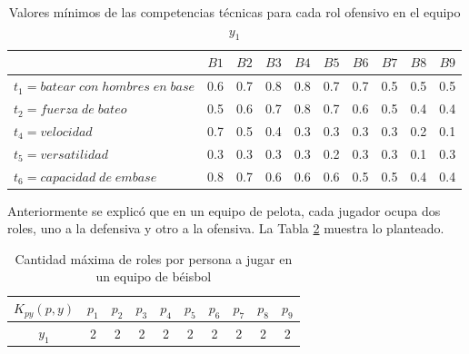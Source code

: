 \begin{table}[H]
	\centering
	\caption{Valores mínimos de las competencias técnicas para cada rol ofensivo en el equipo $y_1$}\label{mcto1-pel}
	\begin{tabular}{|l|c|c|c|c|c|c|c|c|c|}
		\hline
		\thead{$Q(t,r,y)$} & $B1$ & $B2$ & $B3$ & $B4$ & $B5$ & $B6$ & $B7$ & $B8$ & $B9$  \\ \hline
		$t_1=batear\;con\;hombres\;en\;base$ 	     & 0.6  & 0.7  & 0.8  & 0.8  & 0.7  & 0.7  & 0.5  & 0.5  & 0.5 \\ \hline
		$t_2=fuerza\;de\;bateo$ 		 & 0.5  & 0.6  & 0.7  & 0.8  & 0.7  & 0.6  & 0.5  & 0.4  & 0.4 \\ \hline
		$t_4=velocidad$ 		 & 0.7  & 0.5  & 0.4  & 0.3  & 0.3  & 0.3  & 0.3  & 0.2  & 0.1 \\ \hline
		$t_5=versatilidad$   	 & 0.3  & 0.3  & 0.3  & 0.3  & 0.2  & 0.3  & 0.3  & 0.1  & 0.3 \\ \hline
		$t_6=capacidad\;de\;embase$ & 0.8 &  0.7  &  0.6 & 0.6  & 0.6  & 0.5  & 0.5  &  0.4 & 0.4 \\ \hline
	\end{tabular} 
\end{table}




Anteriormente se explicó que en un equipo de pelota, cada jugador ocupa dos roles, uno a la defensiva y otro a la ofensiva. La Tabla \ref{cmrpp-pel} muestra lo planteado.
\begin{table}[H]
	\centering
	\caption{Cantidad máxima de roles por persona a jugar en un equipo de béisbol }\label{cmrpp-pel}
	\begin{tabular}{|c|c|c|c|c|c|c|c|c|c|}
		\hline
		$K_{py}(p,y)$ & $p_1$ & $p_2$ & $p_3$  & $p_4$ & $p_5$ & $p_6$ & $p_7$  & $p_8$ & $p_9$ \\ \hline
		$y_1$ & 2 & 2 & 2 & 2 & 2 & 2 & 2 & 2 & 2 \\ \hline
	\end{tabular}
\end{table}


